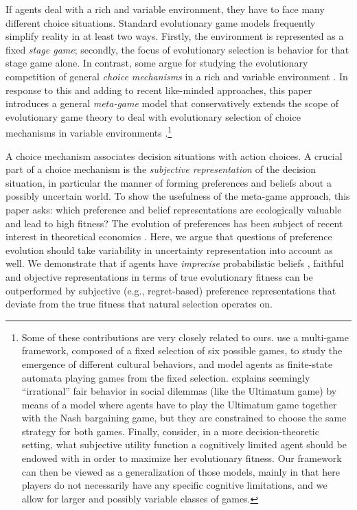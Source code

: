 \documentclass[fleqn,reqno,12pt]{article}
\theoremstyle{Satz}
\theoremstyle{Bsp}
\begin{document}
If agents deal with a rich and variable environment, they have to face many different choice
situations.  Standard evolutionary game models frequently simplify reality in at least two
ways. Firstly, the environment is represented as a fixed \emph{stage game}; secondly, the focus
of evolutionary selection is behavior for that stage game alone. In contrast, some argue for
studying the evolutionary competition of general \emph{choice mechanisms} in a rich and
variable environment
\citep[e.g.,][]{FawcettHamblin2013:Exposing-the-be,McNamara2013:Towards-a-Riche,HammStev12}. In
response to this and adding to recent like-minded approaches, this paper introduces a general
\emph{meta-game} model that conservatively extends the scope of evolutionary game theory to
deal with evolutionary selection of choice mechanisms in variable environments \citep[see
also][]{Harley1981:Learning-the-Ev,ZollmanSmead2010:Plasticity-and-,SmeadZollman2013:The-Stability-o,OConnor2016:Evolving-to-Gen,RayoBecker07,Zollman2008,SkyrmsZollman10,BednarPage07}.\footnote{Some
  of these contributions are very closely related to ours. \citet{BednarPage07} use a
  multi-game framework, composed of a fixed selection of six possible games, to study the
  emergence of different cultural behaviors, and model agents as finite-state automata playing
  games from the fixed selection. \citet{Zollman2008} explains seemingly ``irrational'' fair
  behavior in social dilemmas (like the Ultimatum game) by means of a model where agents have
  to play the Ultimatum game together with the Nash bargaining game, but they are constrained
  to choose the same strategy for both games. Finally, \citet{RayoBecker07} consider, in a more
  decision-theoretic setting, what subjective utility function a cognitively limited agent
  should be endowed with in order to maximize her evolutionary fitness. Our framework can then
  be viewed as a generalization of those models, mainly in that here players do not necessarily
  have any specific cognitive limitations, and we allow for larger and possibly variable
  classes of games.}

A choice mechanism associates decision situations with action choices. A crucial part of a
choice mechanism is the \emph{subjective representation} of the decision situation, in
particular the manner of forming preferences and beliefs about a possibly uncertain world. To
show the usefulness of the meta-game approach, this paper asks: which preference and belief
representations are ecologically valuable and lead to high fitness? The evolution of
preferences has been subject of recent interest in theoretical economics
\citep[e.g.,][]{algweib13,DekElyYlan07,RobSam11}. Here, we argue that questions of preference
evolution should take variability in uncertainty representation into account as well. We
demonstrate that if agents have \emph{imprecise} probabilistic beliefs
\citep[e.g.,][]{gardsah82,levi74,walley96}, faithful and objective representations in terms of
true evolutionary fitness can be outperformed by subjective (e.g., regret-based)
preference representations that deviate from the true fitness that natural selection operates
on.
\end{document}
